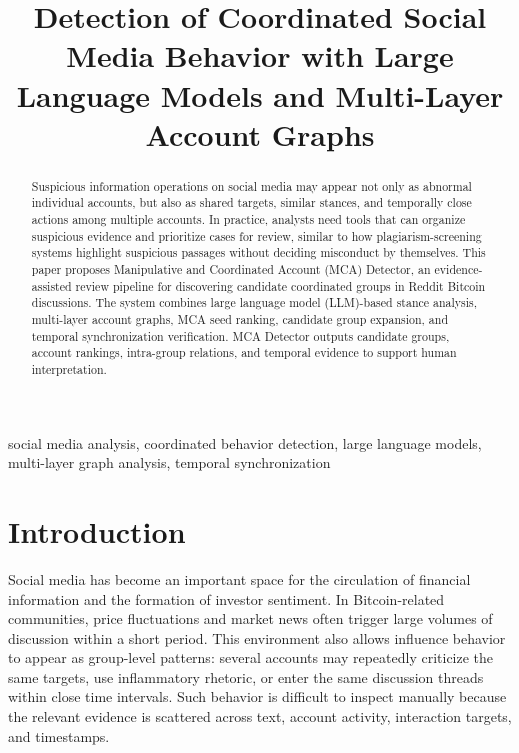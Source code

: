 \documentclass[conference]{IEEEtran}
\begin{document}
\title{Detection of Coordinated Social Media Behavior with Large Language Models and Multi-Layer Account Graphs}

\author{
}
\maketitle

\begin{abstract}
Suspicious information operations on social media may appear not only as abnormal individual accounts, but also as shared targets, similar stances, and temporally close actions among multiple accounts. In practice, analysts need tools that can organize suspicious evidence and prioritize cases for review, similar to how plagiarism-screening systems highlight suspicious passages without deciding misconduct by themselves. This paper proposes Manipulative and Coordinated Account (MCA) Detector, an evidence-assisted review pipeline for discovering candidate coordinated groups in Reddit Bitcoin discussions. The system combines large language model (LLM)-based stance analysis, multi-layer account graphs, MCA seed ranking, candidate group expansion, and temporal synchronization verification. MCA Detector outputs candidate groups, account rankings, intra-group relations, and temporal evidence to support human interpretation.
\end{abstract}

\begin{IEEEkeywords}
social media analysis, coordinated behavior detection, large language models, multi-layer graph analysis, temporal synchronization
\end{IEEEkeywords}

\section{Introduction}
Social media has become an important space for the circulation of financial information and the formation of investor sentiment. In Bitcoin-related communities, price fluctuations and market news often trigger large volumes of discussion within a short period. This environment also allows influence behavior to appear as group-level patterns: several accounts may repeatedly criticize the same targets, use inflammatory rhetoric, or enter the same discussion threads within close time intervals. Such behavior is difficult to inspect manually because the relevant evidence is scattered across text, account activity, interaction targets, and timestamps.
\end{document}

